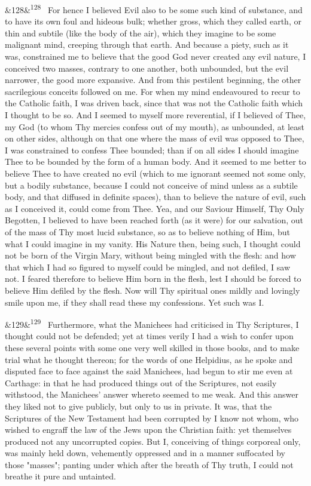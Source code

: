\documentclass[12pt]{article}
\newcommand{\para}[1][]{\par\noindent\ifx&#1&\else\textsuperscript{\footnotesize #1}~\fi}
\begin{document}
\para[128] For hence I believed Evil also to be some such kind of substance, and to have its own foul and hideous bulk; whether gross, which they called earth, or thin and subtile (like the body of the air), which they imagine to be some malignant mind, creeping through that earth. And because a piety, such as it was, constrained me to believe that the good God never created any evil nature, I conceived two masses, contrary to one another, both unbounded, but the evil narrower, the good more expansive. And from this pestilent beginning, the other sacrilegious conceits followed on me. For when my mind endeavoured to recur to the Catholic faith, I was driven back, since that was not the Catholic faith which I thought to be so. And I seemed to myself more reverential, if I believed of Thee, my God (to whom Thy mercies confess out of my mouth), as unbounded, at least on other sides, although on that one where the mass of evil was opposed to Thee, I was constrained to confess Thee bounded; than if on all sides I should imagine Thee to be bounded by the form of a human body. And it seemed to me better to believe Thee to have created no evil (which to me ignorant seemed not some only, but a bodily substance, because I could not conceive of mind unless as a subtile body, and that diffused in definite spaces), than to believe the nature of evil, such as I conceived it, could come from Thee. Yea, and our Saviour Himself, Thy Only Begotten, I believed to have been reached forth (as it were) for our salvation, out of the mass of Thy most lucid substance, so as to believe nothing of Him, but what I could imagine in my vanity. His Nature then, being such, I thought could not be born of the Virgin Mary, without being mingled with the flesh: and how that which I had so figured to myself could be mingled, and not defiled, I saw not. I feared therefore to believe Him born in the flesh, lest I should be forced to believe Him defiled by the flesh. Now will Thy spiritual ones mildly and lovingly smile upon me, if they shall read these my confessions. Yet such was I.

\para[129] Furthermore, what the Manichees had criticised in Thy Scriptures, I thought could not be defended; yet at times verily I had a wish to confer upon these several points with some one very well skilled in those books, and to make trial what he thought thereon; for the words of one Helpidius, as he spoke and disputed face to face against the said Manichees, had begun to stir me even at Carthage: in that he had produced things out of the Scriptures, not easily withstood, the Manichees' answer whereto seemed to me weak. And this answer they liked not to give publicly, but only to us in private. It was, that the Scriptures of the New Testament had been corrupted by I know not whom, who wished to engraff the law of the Jews upon the Christian faith: yet themselves produced not any uncorrupted copies. But I, conceiving of things corporeal only, was mainly held down, vehemently oppressed and in a manner suffocated by those "masses"; panting under which after the breath of Thy truth, I could not breathe it pure and untainted.
\end{document}

